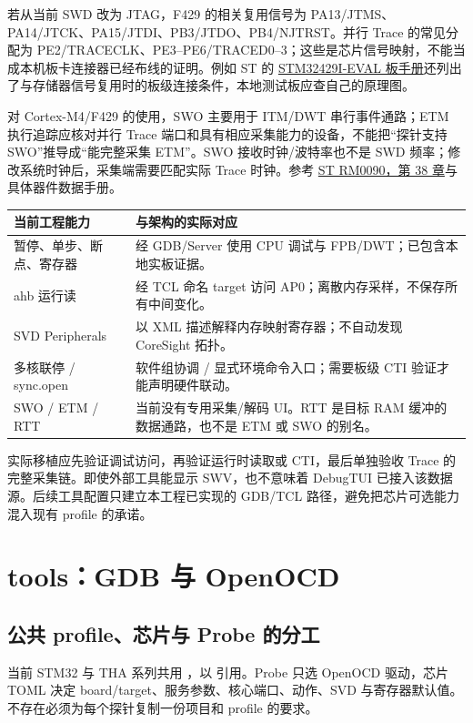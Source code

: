 \documentclass[UTF8,a4paper,11pt,oneside,fontset=none]{ctexart}
\newcommand{\code}[1]{\texttt{\detokenize{#1}}}
\newcommand{\newsection}[1]{\par\Needspace{10\baselineskip}\section{#1}}
\begin{document}
若从当前 SWD 改为 JTAG，F429 的相关复用信号为 PA13/JTMS、PA14/JTCK、PA15/JTDI、PB3/JTDO、PB4/NJTRST。并行 Trace 的常见分配为 PE2/TRACECLK、PE3--PE6/TRACED0--3；这些是芯片信号映射，不能当成本机板卡连接器已经布线的证明。例如 ST 的 \href{https://www.st.com/resource/en/user_manual/um1667-stm32429ieval-evaluation-board-for-stm32f429-mcus-stmicroelectronics.pdf}{STM32429I-EVAL 板手册}还列出了与存储器信号复用时的板级连接条件，本地测试板应查自己的原理图。

对 Cortex-M4/F429 的使用，SWO 主要用于 ITM/DWT 串行事件通路；ETM 执行追踪应核对并行 Trace 端口和具有相应采集能力的设备，不能把“探针支持 SWO”推导成“能完整采集 ETM”。SWO 接收时钟/波特率也不是 SWD 频率；修改系统时钟后，采集端需要匹配实际 Trace 时钟。参考 \href{https://www.st.com/resource/en/reference_manual/rm0090-stm32f407-advanced-armbased-32bit-mcus-stmicroelectronics.pdf}{ST RM0090，第 38 章}与具体器件数据手册。

\noindent\begin{tabularx}{\linewidth}{@{}P{42mm}Y@{}}\toprule
当前工程能力 & 与架构的实际对应\\\midrule
暂停、单步、断点、寄存器 & 经 GDB/Server 使用 CPU 调试与 FPB/DWT；已包含本地实板证据。\\
ahb 运行读 & 经 TCL 命名 target 访问 AP0；离散内存采样，不保存所有中间变化。\\
SVD Peripherals & 以 XML 描述解释内存映射寄存器；不自动发现 CoreSight 拓扑。\\
多核联停 / sync.open & 软件组协调 / 显式环境命令入口；需要板级 CTI 验证才能声明硬件联动。\\
SWO / ETM / RTT & 当前没有专用采集/解码 UI。RTT 是目标 RAM 缓冲的数据通路，也不是 ETM 或 SWO 的别名。\\\bottomrule
\end{tabularx}

实际移植应先验证调试访问，再验证运行时读取或 CTI，最后单独验收 Trace 的完整采集链。即使外部工具能显示 SWV，也不意味着 DebugTUI 已接入该数据源。后续工具配置只建立本工程已实现的 GDB/TCL 路径，避免把芯片可选能力混入现有 profile 的承诺。

\newsection{tools：GDB 与 OpenOCD}\label{sec:tools}

\subsection{公共 profile、芯片与 Probe 的分工}
当前 STM32 与 THA 系列共用 ，以 \code{builtin:arm-openocd} 引用。Probe 只选 OpenOCD 驱动，芯片 TOML 决定 board/target、服务参数、核心端口、动作、SVD 与寄存器默认值。不存在必须为每个探针复制一份项目和 profile 的要求。
\end{document}
